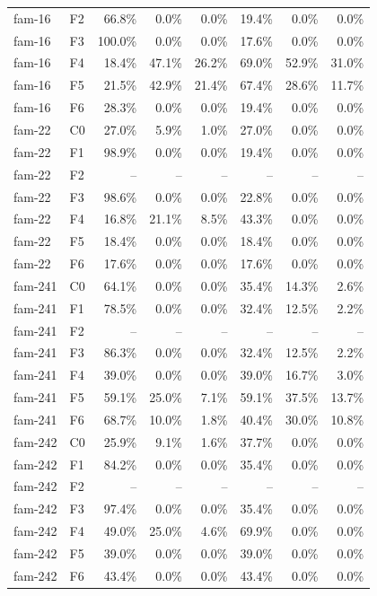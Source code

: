 \begin{tabular}{llrrrrrr}
fam-16 & F2 & 66.8\% & 0.0\% & 0.0\% & 19.4\% & 0.0\% & 0.0\% \\
fam-16 & F3 & 100.0\% & 0.0\% & 0.0\% & 17.6\% & 0.0\% & 0.0\% \\
fam-16 & F4 & 18.4\% & 47.1\% & 26.2\% & 69.0\% & 52.9\% & 31.0\% \\
fam-16 & F5 & 21.5\% & 42.9\% & 21.4\% & 67.4\% & 28.6\% & 11.7\% \\
fam-16 & F6 & 28.3\% & 0.0\% & 0.0\% & 19.4\% & 0.0\% & 0.0\% \\
fam-22 & C0 & 27.0\% & 5.9\% & 1.0\% & 27.0\% & 0.0\% & 0.0\% \\
fam-22 & F1 & 98.9\% & 0.0\% & 0.0\% & 19.4\% & 0.0\% & 0.0\% \\
fam-22 & F2 & -- & -- & -- & -- & -- & -- \\
fam-22 & F3 & 98.6\% & 0.0\% & 0.0\% & 22.8\% & 0.0\% & 0.0\% \\
fam-22 & F4 & 16.8\% & 21.1\% & 8.5\% & 43.3\% & 0.0\% & 0.0\% \\
fam-22 & F5 & 18.4\% & 0.0\% & 0.0\% & 18.4\% & 0.0\% & 0.0\% \\
fam-22 & F6 & 17.6\% & 0.0\% & 0.0\% & 17.6\% & 0.0\% & 0.0\% \\
fam-241 & C0 & 64.1\% & 0.0\% & 0.0\% & 35.4\% & 14.3\% & 2.6\% \\
fam-241 & F1 & 78.5\% & 0.0\% & 0.0\% & 32.4\% & 12.5\% & 2.2\% \\
fam-241 & F2 & -- & -- & -- & -- & -- & -- \\
fam-241 & F3 & 86.3\% & 0.0\% & 0.0\% & 32.4\% & 12.5\% & 2.2\% \\
fam-241 & F4 & 39.0\% & 0.0\% & 0.0\% & 39.0\% & 16.7\% & 3.0\% \\
fam-241 & F5 & 59.1\% & 25.0\% & 7.1\% & 59.1\% & 37.5\% & 13.7\% \\
fam-241 & F6 & 68.7\% & 10.0\% & 1.8\% & 40.4\% & 30.0\% & 10.8\% \\
fam-242 & C0 & 25.9\% & 9.1\% & 1.6\% & 37.7\% & 0.0\% & 0.0\% \\
fam-242 & F1 & 84.2\% & 0.0\% & 0.0\% & 35.4\% & 0.0\% & 0.0\% \\
fam-242 & F2 & -- & -- & -- & -- & -- & -- \\
fam-242 & F3 & 97.4\% & 0.0\% & 0.0\% & 35.4\% & 0.0\% & 0.0\% \\
fam-242 & F4 & 49.0\% & 25.0\% & 4.6\% & 69.9\% & 0.0\% & 0.0\% \\
fam-242 & F5 & 39.0\% & 0.0\% & 0.0\% & 39.0\% & 0.0\% & 0.0\% \\
fam-242 & F6 & 43.4\% & 0.0\% & 0.0\% & 43.4\% & 0.0\% & 0.0\% \\

\end{tabular}
